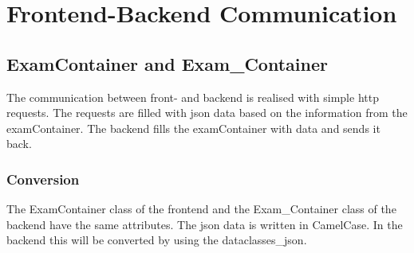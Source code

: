 \author{Paul Hoffmann}
\graphicspath{ {./src/chapters/developer/media/} }

\chapter{Frontend-Backend Communication}

\section{ExamContainer and Exam\_Container}
The communication between front- and backend is realised with simple http requests.
The requests are filled with json data based on the information from the examContainer.
The backend fills the examContainer with data and sends it back.

\subsection{Conversion}
The ExamContainer class of the frontend and the Exam\_Container class of the backend have the same attributes.
The json data is written in CamelCase.
In the backend this will be converted by using the dataclasses\_json.
